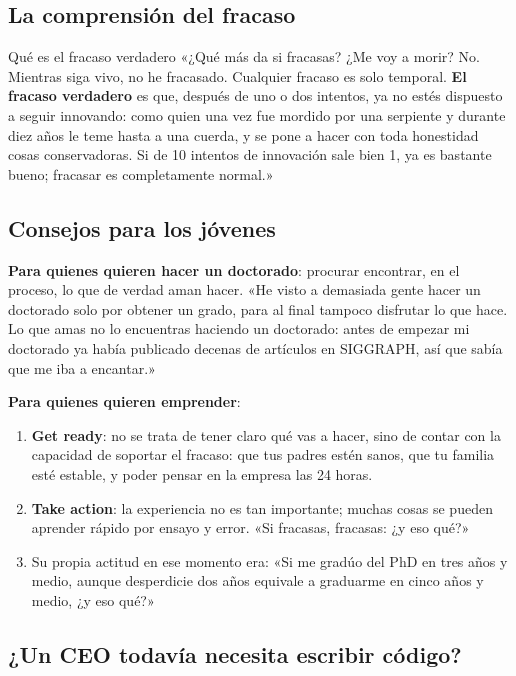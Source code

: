 \documentclass[a4paper]{article}
\begin{document}
\subsection{La comprensión del fracaso}

\begin{importantbox}{Qué es el fracaso verdadero}
«¿Qué más da si fracasas? ¿Me voy a morir? No. Mientras siga vivo, no he fracasado. Cualquier fracaso es solo temporal. \textbf{El fracaso verdadero} es que, después de uno o dos intentos, ya no estés dispuesto a seguir innovando: como quien una vez fue mordido por una serpiente y durante diez años le teme hasta a una cuerda, y se pone a hacer con toda honestidad cosas conservadoras. Si de 10 intentos de innovación sale bien 1, ya es bastante bueno; fracasar es completamente normal.»
\end{importantbox}

\subsection{Consejos para los jóvenes}

\textbf{Para quienes quieren hacer un doctorado}: procurar encontrar, en el proceso, lo que de verdad aman hacer. «He visto a demasiada gente hacer un doctorado solo por obtener un grado, para al final tampoco disfrutar lo que hace. Lo que amas no lo encuentras haciendo un doctorado: antes de empezar mi doctorado ya había publicado decenas de artículos en SIGGRAPH, así que sabía que me iba a encantar.»

\textbf{Para quienes quieren emprender}:
\begin{enumerate}
\item \textbf{Get ready}: no se trata de tener claro qué vas a hacer, sino de contar con la capacidad de soportar el fracaso: que tus padres estén sanos, que tu familia esté estable, y poder pensar en la empresa las 24 horas.
\item \textbf{Take action}: la experiencia no es tan importante; muchas cosas se pueden aprender rápido por ensayo y error. «Si fracasas, fracasas: ¿y eso qué?»
\item Su propia actitud en ese momento era: «Si me gradúo del PhD en tres años y medio, aunque desperdicie dos años equivale a graduarme en cinco años y medio, ¿y eso qué?»
\end{enumerate}

\subsection{¿Un CEO todavía necesita escribir código?}
\end{document}
